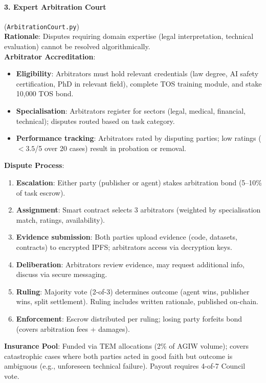 \documentclass[11pt]{article}
\begin{document}
\paragraph{3. Expert Arbitration Court} (\texttt{ArbitrationCourt.py})\\
\textbf{Rationale}: Disputes requiring domain expertise (legal interpretation, technical evaluation) cannot be resolved algorithmically.\\
\textbf{Arbitrator Accreditation}:
\begin{itemize}[noitemsep]
  \item \textbf{Eligibility}: Arbitrators must hold relevant credentials (law degree, AI safety certification, PhD in relevant field), complete TOS training module, and stake 10,000 TOS bond.
  \item \textbf{Specialisation}: Arbitrators register for sectors (legal, medical, financial, technical); disputes routed based on task category.
  \item \textbf{Performance tracking}: Arbitrators rated by disputing parties; low ratings ($<3.5$/5 over 20 cases) result in probation or removal.
\end{itemize}
\textbf{Dispute Process}:
\begin{enumerate}[noitemsep]
  \item \textbf{Escalation}: Either party (publisher or agent) stakes arbitration bond (5--10\% of task escrow).
  \item \textbf{Assignment}: Smart contract selects 3 arbitrators (weighted by specialisation match, ratings, availability).
  \item \textbf{Evidence submission}: Both parties upload evidence (code, datasets, contracts) to encrypted IPFS; arbitrators access via decryption keys.
  \item \textbf{Deliberation}: Arbitrators review evidence, may request additional info, discuss via secure messaging.
  \item \textbf{Ruling}: Majority vote (2-of-3) determines outcome (agent wins, publisher wins, split settlement). Ruling includes written rationale, published on-chain.
  \item \textbf{Enforcement}: Escrow distributed per ruling; losing party forfeits bond (covers arbitration fees + damages).
\end{enumerate}
\textbf{Insurance Pool}: Funded via TEM allocations (2\% of AGIW volume); covers catastrophic cases where both parties acted in good faith but outcome is ambiguous (e.g., unforeseen technical failure). Payout requires 4-of-7 Council vote.
\end{document}
